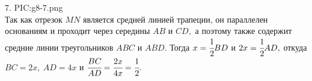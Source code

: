 7. {{PIC:g8-7.png}}\\
Так как отрезок $MN$ является средней линией трапеции, он параллелен основаниям и проходит через середины $AB$ и $CD,$ а поэтому также содержит средние линии треугольников $ABC$ и $ABD.$ Тогда $x=\cfrac{1}{2}BD$ и $2x=\cfrac{1}{2}AD,$ откуда $BC=2x,\ AD=4x$ и $\cfrac{BC}{AD}=\cfrac{2x}{4x}=\cfrac{1}{2}.$\\
